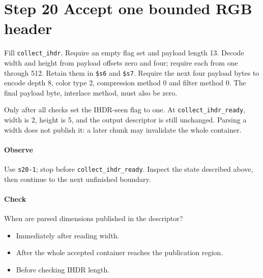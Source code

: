 \section{Step 20 Accept one bounded RGB header}\label{png-collect-s20}
Fill \texttt{collect\_ihdr}. Require an empty flag set and payload length 13. Decode width and height from payload offsets zero and four; require each from one through 512. Retain them in \texttt{\$s6} and \texttt{\$s7}. Require the next four payload bytes to encode depth 8, color type 2, compression method 0 and filter method 0. The final payload byte, interlace method, must also be zero.

Only after all checks set the IHDR-seen flag to one. At \texttt{collect\_ihdr\_ready}, width is 2, height is 5, and the output descriptor is still unchanged. Parsing a width does not publish it: a later chunk may invalidate the whole container.

\paragraph{Observe} Use \texttt{s20-1}; stop before \texttt{collect\_ihdr\_ready}. Inspect the state described above, then continue to the next unfinished boundary.

\paragraph{Check} When are parsed dimensions published in the descriptor?
\begin{itemize}
\item[A.] Immediately after reading width.
\item[B.] After the whole accepted container reaches the publication region.
\item[C.] Before checking IHDR length.
\end{itemize}

